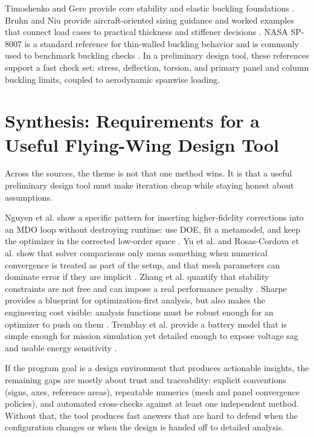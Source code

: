 Timoshenko and Gere provide core stability and elastic buckling foundations \cite{TimoshenkoGere}. Bruhn and Niu provide aircraft-oriented sizing guidance and worked examples that connect load cases to practical thickness and stiffener decisions \cite{Bruhn,Niu}. NASA SP-8007 is a standard reference for thin-walled buckling behavior and is commonly used to benchmark buckling checks \cite{NASASP8007}. In a preliminary design tool, these references support a fast check set: stress, deflection, torsion, and primary panel and column buckling limits, coupled to aerodynamic spanwise loading.

\chapter{Synthesis: Requirements for a Useful Flying-Wing Design Tool}
Across the sources, the theme is not that one method wins. It is that a useful preliminary design tool must make iteration cheap while staying honest about assumptions.

Nguyen et al. show a specific pattern for inserting higher-fidelity corrections into an MDO loop without destroying runtime: use DOE, fit a metamodel, and keep the optimizer in the corrected low-order space \cite{Nguyen2013MFM}. Yu et al. and Rosas-Cordova et al. show that solver comparisons only mean something when numerical convergence is treated as part of the setup, and that mesh parameters can dominate error if they are implicit \cite{Yu2022ICAS,RosasCordova2024VSPAERO}. Zhang et al. quantify that stability constraints are not free and can impose a real performance penalty \cite{Zhang2025ANNGA}. Sharpe provides a blueprint for optimization-first analysis, but also makes the engineering cost visible: analysis functions must be robust enough for an optimizer to push on them \cite{Sharpe2021AeroSandbox}. Tremblay et al. provide a battery model that is simple enough for mission simulation yet detailed enough to expose voltage sag and usable energy sensitivity \cite{Tremblay2007Battery}.

If the program goal is a design environment that produces actionable insights, the remaining gaps are mostly about trust and traceability: explicit conventions (signs, axes, reference areas), repeatable numerics (mesh and panel convergence policies), and automated cross-checks against at least one independent method. Without that, the tool produces fast answers that are hard to defend when the configuration changes or when the design is handed off to detailed analysis.
